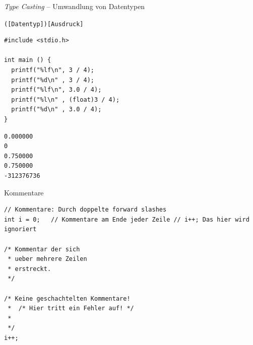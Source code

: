 \begin{frame}[fragile]{\emph{Type Casting} -- Umwandlung von Datentypen}
\begin{codebox}[Syntaxelement]
\footnotesize\texttt{([Datentyp])[Ausdruck]}
\end{codebox}
%
%
\begin{tcbraster}[raster columns=2,
                  raster equal height,
                  nobeforeafter,
                  raster column skip=0.2cm]
\begin{codebox}[Beispiel]
\begin{verbatim}
#include <stdio.h>

int main () {
  printf("%lf\n", 3 / 4);
  printf("%d\n" , 3 / 4);
  printf("%lf\n", 3.0 / 4);
  printf("%l\n" , (float)3 / 4);
  printf("%d\n" , 3.0 / 4);
}
\end{verbatim}
\end{codebox}
%
\begin{cmdbox}[Ausgabe]
\vspace{30pt}
\begin{verbatim}
0.000000
0
0.750000
0.750000
-312376736
\end{verbatim}
\vspace{3pt}
\end{cmdbox}
\end{tcbraster}
%
\end{frame}


\begin{frame}[fragile]{Kommentare}
%
\begin{codebox}[Beispiel]
\begin{verbatim}
// Kommentare: Durch doppelte forward slashes
int i = 0;   // Kommentare am Ende jeder Zeile // i++; Das hier wird ignoriert

/* Kommentar der sich
 * ueber mehrere Zeilen
 * erstreckt.
 */

/* Keine geschachtelten Kommentare!
 *  /* Hier tritt ein Fehler auf! */
 *
 */
i++;
\end{verbatim}
\end{codebox}
%
\end{frame}


